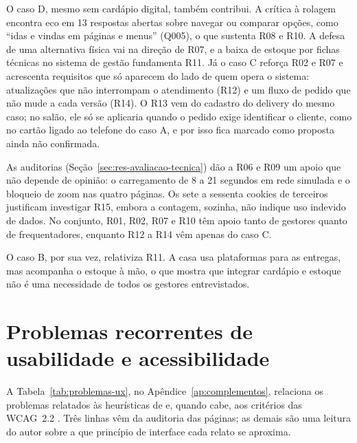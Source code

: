 O caso D, mesmo sem cardápio digital, também contribui. A crítica à rolagem encontra eco em 13 respostas abertas sobre navegar ou comparar opções, como ``idas e vindas em páginas e menus'' (Q005), o que sustenta R08 e R10. A defesa de uma alternativa física vai na direção de R07, e a baixa de estoque por fichas técnicas no sistema de gestão fundamenta R11. Já o caso C reforça R02 e R07 e acrescenta requisitos que só aparecem do lado de quem opera o sistema: atualizações que não interrompam o atendimento (R12) e um fluxo de pedido que não mude a cada versão (R14). O R13 vem do cadastro do delivery do mesmo caso; no salão, ele só se aplicaria quando o pedido exige identificar o cliente, como no cartão ligado ao telefone do caso A, e por isso fica marcado como proposta ainda não confirmada.

As auditorias (Seção~\ref{sec:res-avaliacao-tecnica}) dão a R06 e R09 um apoio que não depende de opinião: o carregamento de 8 a 21 segundos em rede simulada e o bloqueio de zoom nas quatro páginas. Os sete a sessenta cookies de terceiros justificam investigar R15, embora a contagem, sozinha, não indique uso indevido de dados. No conjunto, R01, R02, R07 e R10 têm apoio tanto de gestores quanto de frequentadores, enquanto R12 a R14 vêm apenas do caso C.

O caso B, por sua vez, relativiza R11. A casa usa plataformas para as entregas, mas acompanha o estoque à mão, o que mostra que integrar cardápio e estoque não é uma necessidade de todos os gestores entrevistados.

\section{Problemas recorrentes de usabilidade e acessibilidade}
\label{sec:disc-ux}

A Tabela~\ref{tab:problemas-ux}, no Apêndice~\ref{ap:complementos}, relaciona os problemas relatados às heurísticas de  e, quando cabe, aos critérios das WCAG~2.2 \cite{wcag22}. Três linhas vêm da auditoria das páginas; as demais são uma leitura do autor sobre a que princípio de interface cada relato se aproxima.


